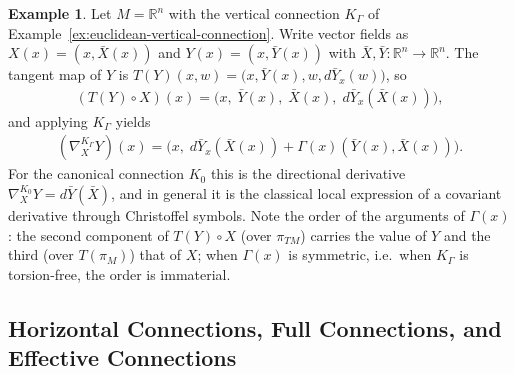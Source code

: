 \documentclass{amsart}
\newcommand{\R}{\mathbb{R}}
\theoremstyle{definition}
\newtheorem{ex}[thm]{Example}
\begin{document}
\begin{ex}\label{ex:covariant-derivative}
 Let $M = \R^n$ with the vertical connection $K_\Gamma$ of
Example~\ref{ex:euclidean-vertical-connection}. Write vector fields as
$X(x) = (x, \bar{X}(x))$ and $Y(x) = (x, \bar{Y}(x))$ with
$\bar{X}, \bar{Y} \colon \R^n \to \R^n$. The tangent map of $Y$ is
$T(Y)(x, w) = \bigl(x, \bar{Y}(x), w, d\bar{Y}_x(w)\bigr)$, so
\begin{align*}
  (T(Y) \circ X)(x)
    = \bigl(x,\; \bar{Y}(x),\; \bar{X}(x),\; d\bar{Y}_x(\bar{X}(x))\bigr),
\end{align*}
and applying $K_\Gamma$ yields
\begin{align*}
  (\nabla^{K_\Gamma}_X Y)(x)
    = \bigl(x,\; d\bar{Y}_x(\bar{X}(x))
      + \Gamma(x)(\bar{Y}(x), \bar{X}(x))\bigr).
\end{align*}
For the canonical connection $K_0$ this is the directional derivative
$\nabla^{K_0}_X Y = d\bar{Y}(\bar{X})$, and in general it is the classical
local expression of a covariant derivative through Christoffel symbols.
Note the order of the arguments of $\Gamma(x)$: the second component of
$T(Y) \circ X$ (over $\pi_{TM}$) carries the value of $Y$ and the third
(over $T(\pi_M)$) that of $X$; when $\Gamma(x)$ is symmetric, i.e.\ when
$K_\Gamma$ is torsion-free, the order is immaterial.
\end{ex}

\subsection{Horizontal Connections, Full Connections, and Effective Connections}%
\label{subsec:full-connection}
\end{document}
